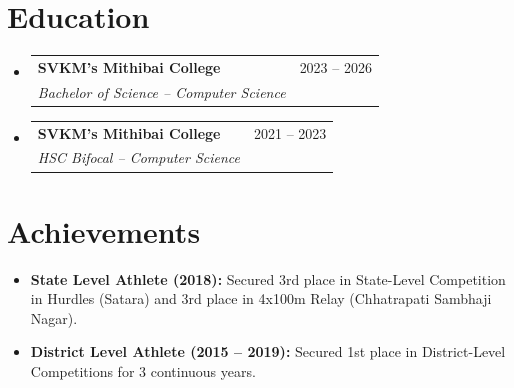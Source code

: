 \documentclass[11pt,letterpaper]{article}
\makeatletter
\newcommand{\resumeItem}[1]{\item\small{\color{MatteBlack}#1}}
\newcommand{\resumeSubheading}[3]{
  \vspace{-1pt}\item
    \begin{tabular*}{0.97\textwidth}[t]{l@{\extracolsep{\fill}}r}
      \textbf{#1} & \color{SlateGrey}#2 \\
      \textit{\small#3} \\
    \end{tabular*}\vspace{-5pt}
}
\makeatother
\begin{document}
\section{Education}
  \begin{itemize}[leftmargin=0.15in, label={}, itemsep=0pt, parsep=0pt]
    \resumeSubheading
      {SVKM's Mithibai College}{2023 -- 2026}
      {Bachelor of Science -- Computer Science}
      \vspace{2pt}
      
    \resumeSubheading
      {SVKM's Mithibai College}{2021 -- 2023}
      {HSC Bifocal -- Computer Science}
  \end{itemize}

\section{Achievements}
  \begin{itemize}[leftmargin=0.15in, label={$\bullet$}, itemsep=1pt, parsep=0pt]
    \resumeItem{\textbf{State Level Athlete (2018):} Secured 3rd place in State-Level Competition in Hurdles (Satara) and 3rd place in 4x100m Relay (Chhatrapati Sambhaji Nagar).}
    \resumeItem{\textbf{District Level Athlete (2015 -- 2019):} Secured 1st place in District-Level Competitions for 3 continuous years.}
  \end{itemize}
\end{document}
